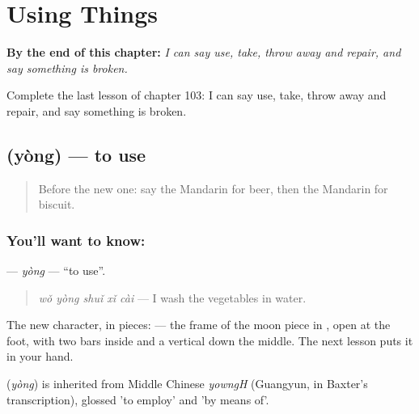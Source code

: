 
\chapter{Using Things}
\label{ch:zh-using-things}

\begin{chapteropening}
\textbf{By the end of this chapter:} \emph{I can say use, take, throw away and repair, and say something is broken.}

Complete the last lesson of chapter 103: I can say use, take, throw away and repair, and say something is broken.
\end{chapteropening}

\section[\texorpdfstring{\zh{用} (yòng)}{用 (yòng)}]{ (yòng) — to use}

\label{lesson:ZH-C103-yong}



\begin{quote}
Before the new one: say the Mandarin for beer, then the Mandarin for biscuit.
\end{quote}

\subsection*{You'll want to know: }
\textbf{} — \emph{yòng} — \textquotedblleft{}to use\textquotedblright{}.

\begin{quote}
\textbf{} \emph{wǒ yòng shuǐ xǐ cài} — I wash the vegetables in water.
\end{quote}

The new character, in pieces:  — the frame of the moon piece in , open at the foot, with two bars inside and a vertical down the middle. The next lesson puts it in your hand.

\begin{cousinweb}
\textbf{} (\emph{yòng}) is inherited from Middle Chinese \emph{yowngH} (Guangyun, in Baxter's transcription), glossed 'to employ' and 'by means of'.
\end{cousinweb}

